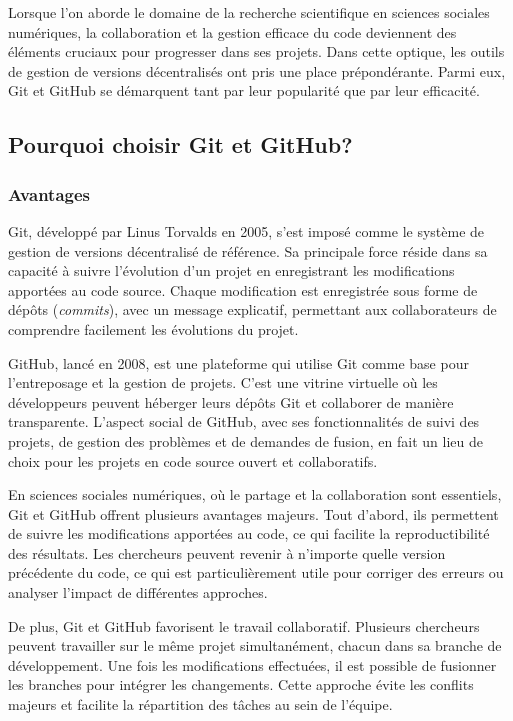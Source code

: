 \documentclass[
  letterpaper,
]{scrbook}
\begin{document}
Lorsque l'on aborde le domaine de la recherche scientifique en sciences
sociales numériques, la collaboration et la gestion efficace du code
deviennent des éléments cruciaux pour progresser dans ses projets. Dans
cette optique, les outils de gestion de versions décentralisés ont pris
une place prépondérante. Parmi eux, Git et GitHub se démarquent tant par
leur popularité que par leur efficacité.

\hypertarget{pourquoi-choisir-git-et-github}{%
\subsection{Pourquoi choisir Git et
GitHub?}\label{pourquoi-choisir-git-et-github}}

\hypertarget{avantages-2}{%
\subsubsection{Avantages}\label{avantages-2}}

Git, développé par Linus Torvalds en 2005, s'est imposé comme le système
de gestion de versions décentralisé de référence. Sa principale force
réside dans sa capacité à suivre l'évolution d'un projet en enregistrant
les modifications apportées au code source. Chaque modification est
enregistrée sous forme de dépôts (\emph{commits}), avec un message
explicatif, permettant aux collaborateurs de comprendre facilement les
évolutions du projet.

GitHub, lancé en 2008, est une plateforme qui utilise Git comme base
pour l'entreposage et la gestion de projets. C'est une vitrine virtuelle
où les développeurs peuvent héberger leurs dépôts Git et collaborer de
manière transparente. L'aspect social de GitHub, avec ses
fonctionnalités de suivi des projets, de gestion des problèmes et de
demandes de fusion, en fait un lieu de choix pour les projets en code
source ouvert et collaboratifs.

En sciences sociales numériques, où le partage et la collaboration sont
essentiels, Git et GitHub offrent plusieurs avantages majeurs. Tout
d'abord, ils permettent de suivre les modifications apportées au code,
ce qui facilite la reproductibilité des résultats. Les chercheurs
peuvent revenir à n'importe quelle version précédente du code, ce qui
est particulièrement utile pour corriger des erreurs ou analyser
l'impact de différentes approches.

De plus, Git et GitHub favorisent le travail collaboratif. Plusieurs
chercheurs peuvent travailler sur le même projet simultanément, chacun
dans sa branche de développement. Une fois les modifications effectuées,
il est possible de fusionner les branches pour intégrer les changements.
Cette approche évite les conflits majeurs et facilite la répartition des
tâches au sein de l'équipe.
\end{document}

